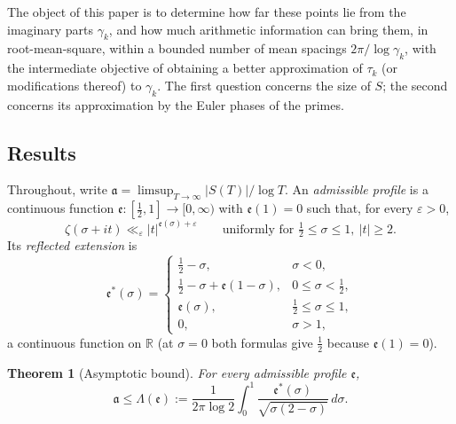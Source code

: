 \documentclass[11pt,a4paper]{article}
\numberwithin{equation}{section}
\newtheorem{theorem}{Theorem}[section]
\theoremstyle{definition}
\theoremstyle{remark}
\newcommand{\R}{\mathbb R}
\begin{document}
The object of this paper is to determine how far these points lie from the imaginary parts $\gamma_k$, and how much arithmetic information can bring them, in root-mean-square, within a bounded number of mean spacings $2\pi/\log\gamma_k$, with the intermediate objective of obtaining a better approximation of $\tau_k$ (or modifications thereof) to $\gamma_k$. The first question concerns the size of $S$; the second concerns its approximation by the Euler phases of the primes.

\subsection{Results}\label{subsec:results}
Throughout, write $\mathfrak a=\limsup_{T\to\infty}|S(T)|/\log T$. An \emph{admissible profile} is a continuous function $\mathfrak e:[\frac12,1]\to[0,\infty)$ with $\mathfrak e(1)=0$ such that, for every $\varepsilon>0$,
\begin{equation}
\zeta(\sigma+it)\ll_\varepsilon|t|^{\mathfrak e(\sigma)+\varepsilon}\qquad\text{uniformly for }\tfrac12\le\sigma\le1,\ |t|\ge2 .
\label{eq:admissible}
\end{equation}
Its \emph{reflected extension} is
\begin{equation}
\mathfrak e^*(\sigma)=\begin{cases}\frac12-\sigma,&\sigma<0,\\ \frac12-\sigma+\mathfrak e(1-\sigma),&0\le\sigma<\frac12,\\ \mathfrak e(\sigma),&\frac12\le\sigma\le1,\\ 0,&\sigma>1,\end{cases}
\label{eq:reflected}
\end{equation}
a continuous function on $\R$ (at $\sigma=0$ both formulas give $\frac12$ because $\mathfrak e(1)=0$).

\begin{theorem}[Asymptotic bound]\label{thm:asymptotic}
For every admissible profile $\mathfrak e$,
\begin{equation}
\mathfrak a\le\Lambda(\mathfrak e):=\frac1{2\pi\log2}\int_0^1\frac{\mathfrak e^*(\sigma)}{\sqrt{\sigma(2-\sigma)}}\,d\sigma .
\label{eq:asymptotic_formula}
\end{equation}
\end{theorem}
\end{document}
